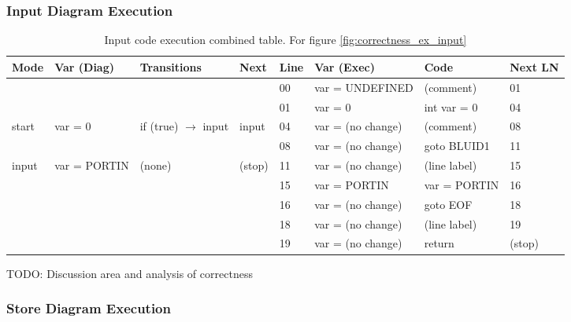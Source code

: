 \subsubsection{Input Diagram Execution}

\begin{table}[htcb]
	\caption{Input code execution combined table. For figure \ref{fig:correctness_ex_input}}
	\centering
	\tablefontsize
		\begin{tabular}{| p{} | p{} | p{} | p{} | p{} | p{} | p{} | p{} |}
			\hline
			\textbf{Mode} 		&	\textbf{Var (Diag)} 		& 	\textbf{Transitions} 		& 	\textbf{Next}		&	\textbf{Line}		&	\textbf{Var (Exec)	}	&	\textbf{Code}	&	\textbf{Next LN} \\
			\hline			
								&								&								&						&	00					& 	var = UNDEFINED			&	(comment)		&	01	\\
			\hline
								&								&								&						&	01					&	var = 0					&	int var = 0		&	04	\\
			\hline
			start 				&	var = 0						&if (true) $\rightarrow$ input	&	input				&	04					&	var = (no change)		& 	(comment)		&	08	\\
			\hline
								&								&								&						&	08					&	var = (no change)		&	goto BLUID1		&	11	\\
			\hline
			input				&	var = PORTIN				&	(none)						&	(stop)				&	11					&	var = (no change)		&	(line label)	&	15	\\
			\hline
								&								&								&						&	15					&	var = PORTIN			&	var = PORTIN	&	16	\\
			\hline
								&								&								&						&	16					&	var = (no change)		&	goto EOF		&	18	\\
			\hline
								&								&								&						&	18					&	var = (no change)		&	(line label)	&	19	\\
			\hline
								&								&								&						&	19					&	var = (no change)		&	return			&	(stop)	\\
			\hline
		\end{tabular}
	\label{table:InputExecCombined}
\end{table}

TODO: Discussion area and analysis of correctness


\subsubsection{Store Diagram Execution}


